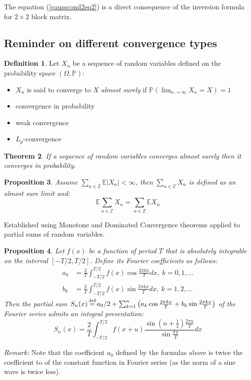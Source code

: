 \documentclass[12pt]{article}
\newtheorem{theorem}{Theorem}[section]
\newtheorem{proposition}[theorem]{Proposition}
\theoremstyle{definition}
\newtheorem{definition}[theorem]{Definition}
\theoremstyle{remark}
\numberwithin{equation}{section}
\newcommand{\PP}{\mathbb{P}}
\newcommand{\ZZ}{\mathbb{Z}}
\newcommand{\EE}{\mathbb{E}}
\newcommand{\eq}{\stackrel{\mathclap{\normalfont\text{def}}}{=}}
\begin{document}
The equation (\ref{gausscond2eq2}) is a direct consequence of the inversion formula for $2\times 2$ block matrix.



\subsection{Reminder on different convergence types}
\begin{definition}
	Let $X_n$ be a sequence of random variables defined on the probability space $\left(\Omega, \PP\right)$:
	\begin{itemize}
		\item $X_n$ is said to converge to $X$ \emph{almost surely} if $\PP(\lim_{n\rightarrow \infty}X_n = X) = 1$
		\item convergence in probability
		\item weak convergence
		\item $L_p$-convergence
	\end{itemize}
\end{definition}

\begin{theorem}
	If a sequence of random variables converges almost surely then it converges in probability.
\end{theorem}

\begin{proposition}
	Assume $\sum_{n\in\ZZ}\EE|X_n| < \infty$, then $\sum_{n\in\ZZ}X_n$ is defined as an almost sure limit and:
	\begin{equation*}
		\EE\sum_{n\in\ZZ}X_n = \sum_{n\in\ZZ}\EE X_n
	\end{equation*}
\end{proposition}
\proof Established using Monotone and Dominated Convergence theorems applied to partial sums of random variables.


\begin{proposition}
	Let $f(x)$ be a function of period $T$ that is absolutely integrable on the interval $[-T/2, T/2]$. Define its Fourier coefficients as follows:
\begin{align*}
	a_k &= \frac 2 T \int_{-T/2}^{T/2} f(x)\cos \frac {2\pi kx}T dx, \ k = 0,1, \ldots \\
	b_k &= \frac 2 T \int_{-T/2}^{T/2} f(x)\sin \frac {2\pi kx}T dx, \ k = 1,2, \ldots
\end{align*}
Then the partial sum $S_n(x) \eq a_0/2 + \sum_{k=1}^n \left( a_k \cos {\frac {2\pi kx}T}+b_k \sin {\frac {2\pi kx}T}\right)$ of the Fourier series admits an integral presentation:
\begin{equation*}
	S_n(x) = \frac 2 T \int_{-T/2}^{T/2} f(x+u) \frac {\sin(n+\frac 1 2)\frac{2\pi u}{T}}{\sin\frac {\pi u}{T}}dx
\end{equation*}
\end{proposition}
\emph{Remark:} Note that the coefficient $a_0$ defined by the formulas above is twice the coefficient to of the constant function in Fourier series (as the norm of a sine wave is twice less).
\end{document}
